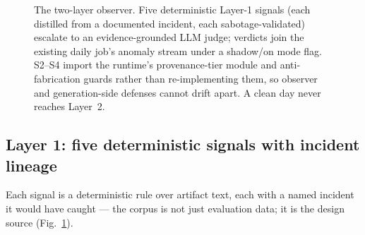 \documentclass[11pt]{article}
\begin{document}
\begin{figure}[t]
\caption{The two-layer observer. Five deterministic Layer-1 signals
(each distilled from a documented incident, each sabotage-validated)
escalate to an evidence-grounded LLM judge; verdicts join the existing
daily job's anomaly stream under a shadow/on mode flag. S2--S4 import
the runtime's provenance-tier module and anti-fabrication guards rather
than re-implementing them, so observer and generation-side defenses
cannot drift apart. A clean day never reaches Layer~2.}
\label{fig:pipeline}
\end{figure}

\subsection{Layer 1: five deterministic signals with incident lineage}
\label{sec:layer1}

Each signal is a deterministic rule over artifact text, each with a
named incident it would have caught --- the corpus is not just
evaluation data; it is the design source
(Fig.~\ref{fig:pipeline}).
\end{document}
